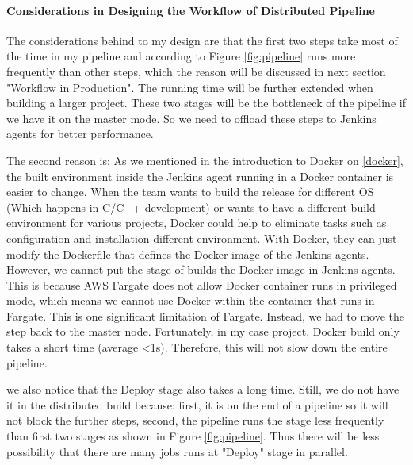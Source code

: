 \paragraph[]{Considerations in Designing the Workflow of Distributed Pipeline}
The considerations behind to my design are that the first two steps take most of the time in my pipeline and according to Figure \ref{fig:pipeline} runs more frequently than other steps, which the reason will be discussed in next section "Workflow in Production". The running time will be further extended when building a larger project. These two stages will be the bottleneck of the pipeline if we have it on the master mode. So we need to offload these steps to Jenkins agents for better performance.
\par
The second reason is: As we mentioned in the introduction to Docker on \ref {docker}, the built environment inside the Jenkins agent running in a Docker container is easier to change.
When the team wants to build the release for different OS (Which happens in C/C++ development) or wants to have a different build environment for various projects, Docker could help to eliminate tasks such as configuration and installation different environment. With Docker, they can just modify the Dockerfile that defines the Docker image of the Jenkins agents. 
However, we cannot put the stage of builds the Docker image in Jenkins agents. This is because AWS Fargate does not allow Docker container runs in privileged mode, which means we cannot use Docker within the container that runs in Fargate. This is one significant limitation of Fargate. Instead, we had to move the step back to the master node. Fortunately, in my case project, Docker build only takes a short time (average <1s). Therefore, this will not slow down the entire pipeline.
\par
we also notice that the Deploy stage also takes a long time. Still, we do not have it in the distributed build because: first, it is on the end of a pipeline so it will not block the further steps, second, the pipeline runs the stage less frequently than first two stages as shown in Figure \ref{fig:pipeline}. Thus there will be less possibility that there are many jobs runs at "Deploy" stage in parallel.
